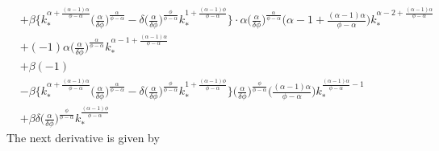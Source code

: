 \documentclass[a4paper]{article}
\theoremstyle{definition}
\begin{document}
\begin{align*}
												&+ \beta \Big\{ k_{*}^{\alpha+\frac{(\alpha-1)\alpha}{\phi-\alpha}} \Big( \frac{\alpha}{\delta\phi} \Big)^{\frac{\alpha}{\phi-\alpha}} - \delta \Big( \frac{\alpha}{\delta\phi} \Big)^{\frac{\phi}{\phi-\alpha}}k_{*}^{1+\frac{(\alpha-1)\phi}{\phi-\alpha}} \Big\} \cdot \alpha \Big( \frac{\alpha}{\delta\phi} \Big)^{\frac{\alpha}{\phi-\alpha}}\Big( \alpha-1+\frac{(\alpha-1)\alpha}{\phi-\alpha} \Big)k_{*}^{\alpha-2+\frac{(\alpha-1)\alpha}{\phi-\alpha}} \\ 
												&+ (-1)\alpha \Big( \frac{\alpha}{\delta\phi} \Big)^{\frac{\alpha}{\phi-\alpha}} k_{*}^{\alpha-1+\frac{(\alpha-1)\alpha}{\phi-\alpha}} \\
												&+ \beta (-1) \\
												&- \beta \Big\{ k_{*}^{\alpha+\frac{(\alpha-1)\alpha}{\phi-\alpha}} \Big( \frac{\alpha}{\delta\phi} \Big)^{\frac{\alpha}{\phi-\alpha}} - \delta \Big( \frac{\alpha}{\delta\phi} \Big)^{\frac{\phi}{\phi-\alpha}} k_{*}^{1+\frac{(\alpha-1)\phi}{\phi-\alpha}} \Big\}  \Big( \frac{\alpha}{\delta\phi} \Big)^{\frac{\phi}{\phi-\alpha}} \Big( \frac{(\alpha-1)\alpha}{\phi-\alpha} \Big)k_{*}^{\frac{(\alpha-1)\alpha}{\phi-\alpha}-1} \\
												&+ \beta \delta \Big( \frac{\alpha}{\delta\phi} \Big)^{\frac{\phi}{\phi-\alpha}}k_{*}^{\frac{(\alpha-1)\phi}{\phi-\alpha}}
	\end{align*}
The next derivative is given by
\end{document}
